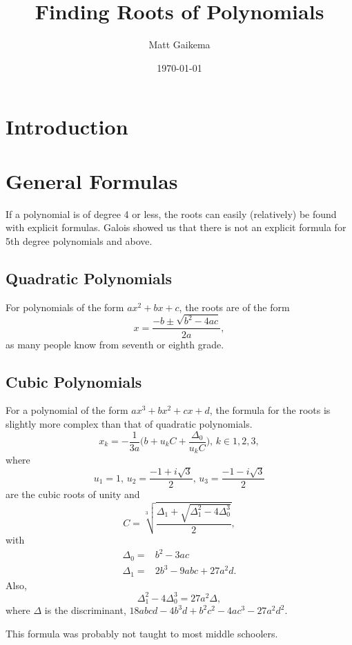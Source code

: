 \documentclass{article}
\title{Finding Roots of Polynomials}
\author{Matt Gaikema}
\date{\today}
\begin{document}
\maketitle

\section{Introduction}

\section{General Formulas}

If a polynomial is of degree 4 or less, the roots can easily (relatively) be found with explicit formulas.
Galois showed us that there is not an explicit formula for 5th degree polynomials and above.

\subsection{Quadratic Polynomials}

For polynomials of the form $ax^2+bx+c$, the roots are of the form
\begin{equation}
	x = \frac{-b\pm\sqrt{b^2-4ac}}{2a},
\end{equation}
as many people know from seventh or eighth grade. 

\subsection{Cubic Polynomials}

For a polynomial of the form $ax^3+bx^2+cx+d$, the formula for the roots is slightly more complex than that of quadratic polynomials.\cite{wiki:cubic}
\begin{equation}
	x_k=-\frac{1}{3a}\bigg(b+u_kC+\frac{\Delta_0}{u_kC}\bigg),\,k\in{1,2,3},
\end{equation}
where 
\[u_1=1,\,u_2=\frac{-1+i\sqrt{3}}{2},\,u_3=\frac{-1-i\sqrt{3}}{2}\]
are the cubic roots of unity and
\[C=\sqrt[3]{\frac{\Delta_1+\sqrt{\Delta_1^2-4\Delta_0^3}}{2}},\]
with 
\begin{align*}
	\Delta_0 =& b^2-3ac \\
	\Delta_1 =& 2b^3-9abc+27a^2d.
\end{align*}
Also,
\[\Delta_1^2-4\Delta_0^3=27a^2\Delta,\]
where $\Delta$ is the discriminant, $18abcd-4b^3d+b^2c^2-4ac^3-27a^2d^2$.

This formula was probably not taught to most middle schoolers.
\end{document}
